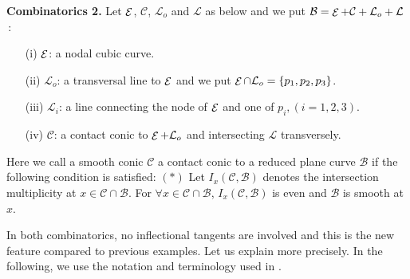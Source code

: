 \documentclass{article}
\newcommand{\PP}{\mathbb P}
\newcommand{\mcB}{\mathcal B}
\newcommand{\mcC}{\mathcal C}
\newcommand{\mcL}{\mathcal L}
\newcommand{\mcE}{\mathop {\cal E}\nolimits}
\begin{document}


{\bf Combinatorics 2.} Let  $\mcE$, $\mcC$, $\mcL_o$ and $\mcL$ as below and
we put $\mcB = \mcE + \mcC +  \mcL_o + \mcL$\,:

\begin{enumerate}

\item[(i)] $\mcE$:  a nodal cubic curve.

\item[(ii)] $\mcL_o$: a transversal line to $\mcE$ and we put $\mcE \cap  \mcL_o = \{p_1, p_2, p_3\}$.

\item[(iii)] $\mcL_i$: a  line connecting the node of  $\mcE$  and one of $p_i, (i = 1, 2, 3)$.

\item[(iv)] $\mcC$: a contact conic  to $\mcE + \mcL_o$ and intersecting $\mcL$ transversely.

\end{enumerate}


 Here
 we call a smooth conic $\mcC$ a contact conic to a reduced plane curve $\mcB$ if the following condition is satisfied:
$(\ast)$ Let $I_x(\mcC, \mcB)$ denotes the intersection multiplicity at $x \in \mcC \cap \mcB$.
For $\forall x \in \mcC \cap \mcB$, $I_x(\mcC, \mcB)$ is even and $\mcB$ is smooth at $x$. 




In both combinatorics, no inflectional tangents are involved and this is the new feature compared to 
previous examples. 
Let us explain more precisely. In the following, we use
the  notation and terminology  used in \cite{bannai-tokunaga}.

%
%
%
%
\end{document}
